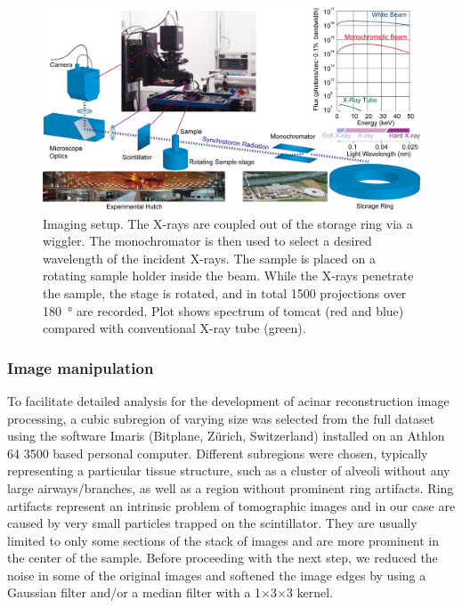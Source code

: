 \begin{figure}[htb]
	\centering
	\includegraphics[width=\imsize]{img/Tsuda2008/Tsuda-02}
	\caption[SRXTM imaging setup]{Imaging setup. The X-rays are coupled out of the storage ring via a wiggler. The monochromator is then used to select a desired wavelength of the incident
X-rays. The sample is placed on a rotating sample holder inside the beam. While the X-rays penetrate the sample, the stage is rotated, and in total 1500 projections over \SI{180}{\degree} are recorded. Plot shows spectrum of \ac{tomcat} (red and blue) compared with conventional X-ray tube (green).}
	\label{fig:imaging setup}
\end{figure}

\subsubsection{Image manipulation}
To facilitate detailed analysis for the development of \threed acinar reconstruction image processing, a cubic subregion of varying size was selected from the full dataset using the software Imaris (Bitplane, Zürich, Switzerland) installed on an Athlon 64 3500 based personal computer. Different subregions were chosen, typically representing a particular tissue structure, such as a cluster of alveoli without any large airways/branches, as well as a region without prominent ring artifacts. Ring artifacts represent an intrinsic problem of tomographic images and in our case are caused by very small particles trapped on the scintillator. They are usually limited to only some sections of the stack of images and are more prominent in the center of the sample. Before proceeding with the next step, we reduced the noise in some of the original \twod images and softened the image edges by using a Gaussian filter and/or a median filter with a 1$\times$3$\times$3 kernel.

